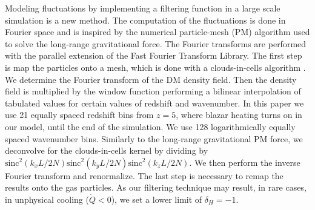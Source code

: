 \documentclass[numberedappendix]{emulateapj}
\begin{document}
Modeling fluctuations by implementing a filtering function in a large scale simulation is a new method. The computation of the fluctuations is done in Fourier space and is inspired by the numerical particle-mesh (PM) algorithm used to solve the long-range gravitational force. The Fourier transforms are performed with the parallel extension of the Fast Fourier Transform Library. The first step is map the particles onto a mesh, which is done with a clouds-in-cells algorithm \citep{1981csup.book.....H}. We determine the Fourier transform of the DM density field. Then the density field is multiplied by the window function performing a bilinear interpolation of tabulated values for certain values of redshift and wavenumber. In this paper we use 21 equally spaced redshift bins from $z=5$, where blazar heating turns on in our model, until the end of the simulation. We use 128 logarithmically equally spaced wavenumber bins. Similarly to the long-range gravitational PM force, we deconvolve for the clouds-in-cells kernel by dividing by $\mathrm{sinc}^2(k_x L/2N)\mathrm{sinc}^2(k_y L/2N)\mathrm{sinc}^2(k_z L/2N)$. We then perform the inverse Fourier transform and renormalize. The last step is necessary to remap the results onto the gas particles. As our filtering technique may result, in rare cases, in unphysical cooling ($\dot{Q}< 0$), we set a lower limit of  $\delta_H =-1$.
\end{document}
